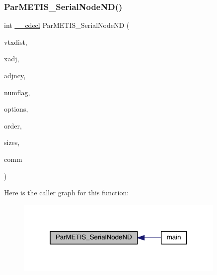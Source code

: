 \subsubsection{\texorpdfstring{Par\+M\+E\+T\+I\+S\+\_\+\+Serial\+Node\+N\+D()}{ParMETIS\_SerialNodeND()}}
{\footnotesize\ttfamily int \hyperlink{include_2parmetis_8h_a238347d7669f8f1e9c83bfe63a2730c4}{\+\_\+\+\_\+cdecl} Par\+M\+E\+T\+I\+S\+\_\+\+Serial\+Node\+ND (\begin{DoxyParamCaption}\item[{\hyperlink{3rd_party_2parmetis-4_80_83_2metis_2include_2metis_8h_aaa5262be3e700770163401acb0150f52}{idx\+\_\+t} $\ast$}]{vtxdist,  }\item[{\hyperlink{3rd_party_2parmetis-4_80_83_2metis_2include_2metis_8h_aaa5262be3e700770163401acb0150f52}{idx\+\_\+t} $\ast$}]{xadj,  }\item[{\hyperlink{3rd_party_2parmetis-4_80_83_2metis_2include_2metis_8h_aaa5262be3e700770163401acb0150f52}{idx\+\_\+t} $\ast$}]{adjncy,  }\item[{\hyperlink{3rd_party_2parmetis-4_80_83_2metis_2include_2metis_8h_aaa5262be3e700770163401acb0150f52}{idx\+\_\+t} $\ast$}]{numflag,  }\item[{\hyperlink{3rd_party_2parmetis-4_80_83_2metis_2include_2metis_8h_aaa5262be3e700770163401acb0150f52}{idx\+\_\+t} $\ast$}]{options,  }\item[{\hyperlink{3rd_party_2parmetis-4_80_83_2metis_2include_2metis_8h_aaa5262be3e700770163401acb0150f52}{idx\+\_\+t} $\ast$}]{order,  }\item[{\hyperlink{3rd_party_2parmetis-4_80_83_2metis_2include_2metis_8h_aaa5262be3e700770163401acb0150f52}{idx\+\_\+t} $\ast$}]{sizes,  }\item[{M\+P\+I\+\_\+\+Comm $\ast$}]{comm }\end{DoxyParamCaption})}

Here is the caller graph for this function\+:\nopagebreak
\begin{figure}[H]
\begin{center}
\leavevmode
\includegraphics[width=286pt]{3rd_party_2parmetis-4_80_83_2include_2parmetis_8h_a8bd1a6399ac304da6616cb5329304df6_icgraph}
\end{center}
\end{figure}
\mbox{\label{3rd_party_2parmetis-4_80_83_2include_2parmetis_8h_a1bbf9ca25d902b187988a49ccf435e2b}} 
